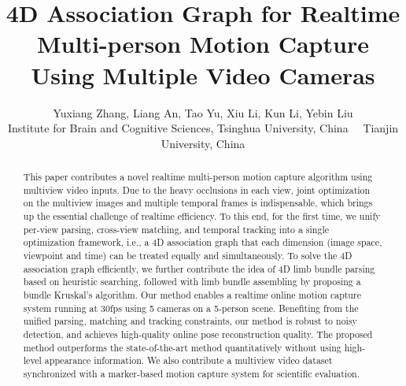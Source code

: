 \documentclass[10pt,twocolumn,letterpaper]{article}
\begin{document}
\title{4D Association Graph for Realtime Multi-person Motion Capture \\ Using Multiple Video Cameras}

\author{Yuxiang Zhang, Liang An, Tao Yu, Xiu Li, Kun Li, Yebin Liu\\
Institute for Brain and Cognitive Sciences, Tsinghua University, China \ \ Tianjin University, China\\
}

\maketitle



\begin{abstract}
This paper contributes a novel realtime multi-person motion capture algorithm using multiview video inputs. Due to the heavy occlusions in each view, joint optimization on the multiview images and multiple temporal frames is indispensable, which brings up the essential challenge of realtime efficiency. To this end, for the first time, we unify per-view parsing, cross-view matching, and temporal tracking into a single optimization framework, i.e., a 4D association graph that each dimension (image space, viewpoint and time) can be treated equally and simultaneously. To solve the 4D association graph efficiently, we further contribute the idea of 4D limb bundle parsing based on heuristic searching, followed with limb bundle assembling by proposing a bundle Kruskal's algorithm. Our method enables a realtime online motion capture system running at 30fps using 5 cameras on a 5-person scene. Benefiting from the unified parsing, matching and tracking constraints, our method is robust to noisy detection, and achieves high-quality online pose reconstruction quality. The proposed method outperforms the state-of-the-art method quantitatively without using high-level appearance information. We also contribute a multiview video dataset synchronized with a marker-based motion capture system for scientific evaluation. 
\end{abstract}  
\vspace{-2mm}
\end{document}
